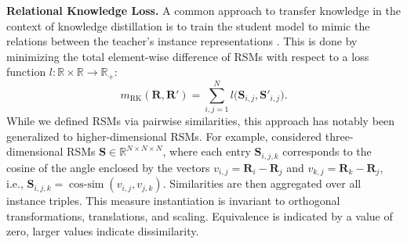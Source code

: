 \documentclass{article}
\newcommand{\citet}{\textcite}
\newcommand{\Real}{\mathbb{R}}
\newcommand{\R}{\bm{R}}
\newcommand{\Rp}{\bm{R'}}
\newcommand{\Sm}{\bm{S}}
\newcommand{\Smp}{\bm{S'}}
\newcommand{\subheader}{\textbf}
\begin{document}
\subheader{Relational Knowledge Loss.}
A common approach to transfer knowledge in the context of knowledge distillation is to train the student model to mimic the relations between the teacher's instance representations \cite{gou2021knowledge}.
This is done by minimizing the total element-wise difference of RSMs with respect to a loss function $l: \Real \times \Real \longrightarrow \Real_+$:
\begin{equation}
    m_{\operatorname{RK}}(\R, \Rp)= \textstyle\sum_{i,j = 1}^N l\big(\Sm_{i,j}, \Smp_{i,j} \big).
\end{equation}
While we defined RSMs via pairwise similarities, this approach has notably been generalized to higher-dimensional RSMs.
For example, \citet{park_relational_2019} considered three-dimensional RSMs $\Sm\in\Real^{N \times N\times N}$, where each entry $\Sm_{i,j,k}$ corresponds to the cosine of the angle enclosed by the vectors $v_{i,j} = \R_i - \R_j$ and $v_{k,j} = \R_k-\R_j$, i.e., $\Sm_{i,j,k} = \operatorname{cos-sim}(v_{i,j}, v_{j,k})$.
Similarities are then aggregated over all instance triples.
This measure instantiation is invariant to orthogonal transformations,  translations, and scaling.
Equivalence is indicated by a value of zero, larger values indicate dissimilarity.
\end{document}
